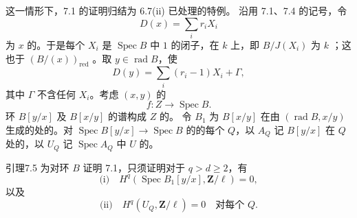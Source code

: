 这一情形下，7.1 的证明归结为 6.7(ii) 已处理的特例。
沿用 7.1、7.4 的记号，令
\[D(x)=\sum_i r_iX_i\]
为 $x$ 的。于是每个 $X_i$ 是 $\operatorname{Spec}B$ 中 $1$ 的闭子，在 $k$ 上，即 $B/J(X_i)$ 为 $k$ ；这也于 $(B/(x))_{\mathrm{red}}$ 。取 $y\in\operatorname{rad}B$，使
\[D(y)=\sum_i(r_i-1)X_i+\Gamma,\]
其中 $\Gamma$ 不含任何 $X_i$。考虑 $(x,y)$ 的
\[f:Z\longrightarrow\operatorname{Spec}B.\]
环 $B[y/x]$ 及 $B[x/y]$ 的谱构成 $Z$ 的。
令 $B_1$ 为 $B[x/y]$ 在由 $(\operatorname{rad}B,x/y)$ 生成的处的。对 $\operatorname{Spec}B[y/x]\to\operatorname{Spec}B$ 的的每个 $Q$，以 $A_Q$ 记 $B[y/x]$ 在 $Q$ 处的，以 $U_Q$ 记 $\operatorname{Spec}A_Q$ 中 $U$ 的。
\begin{SGAresult}{引理}{7.5}
为对环 $B$ 证明 7.1，只须证明对于 $q>d\ge2$，有
\[\text{(i)}\quad H^q(\operatorname{Spec}B_1[y/x],\mathbf Z/\ell)=0,\]
以及
\[\text{(ii)}\quad H^q(U_Q,\mathbf Z/\ell)=0\quad\text{对每个 }Q.\]
\end{SGAresult}
